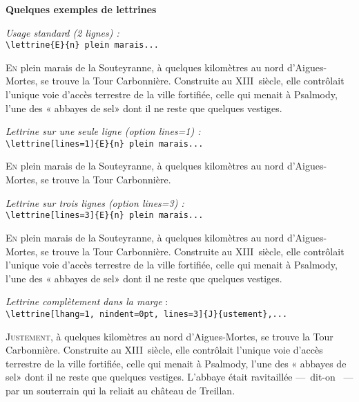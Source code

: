 \documentclass[12pt,a4paper,german,french]{article}
\begin{document}
\thispagestyle{empty}

\begin{center}
\large\bfseries Quelques exemples de lettrines
\end{center}

\vspace{\baselineskip}
\textit{Usage standard (2 lignes) :}\\
\verb+\lettrine{E}{n} plein marais...+

\lettrine{E}{n} plein marais de la Souteyranne, à quelques kilomètres
au nord d'Aigues-Mortes, se trouve la Tour Carbonnière.
Construite au XIII\ieme~siècle, elle contrôlait l'unique voie d'accès
terrestre de la ville fortifiée, celle qui menait à Psalmody,
l'une des « abbayes de sel» dont il ne reste que quelques vestiges.

\vspace{\baselineskip}
\textit{Lettrine sur une seule ligne (option {\ttfamily\upshape lines=1}) :}\\
\verb+\lettrine[lines=1]{E}{n} plein marais...+

\lettrine[lines=1]{E}{n} plein marais de la Souteyranne,
à quelques kilomètres au nord d'Aigues-Mortes, se trouve
la Tour Carbonnière.

\vspace{\baselineskip}
\textit{Lettrine sur trois lignes (option {\ttfamily\upshape lines=3}) :}\\
\verb+\lettrine[lines=3]{E}{n} plein marais...+

\lettrine[lines=3]{E}{n} plein marais de la Souteyranne,
à quelques kilomètres au nord d'Aigues-Mortes,
se trouve la Tour Carbonnière.
Construite au XIII\ieme~siècle, elle contrôlait l'unique voie d'accès
terrestre de la ville fortifiée, celle qui menait à Psalmody,
l'une des « abbayes de sel» dont il ne reste que quelques vestiges.

\vspace{\baselineskip}
\textit{Lettrine complètement dans la marge} :\\
\verb+\lettrine[lhang=1, nindent=0pt, lines=3]{J}{ustement},...+

\lettrine[lhang=1, nindent=0pt, lines=3]{J}{ustement},
à quelques kilomètres au nord d'Aigues-Mortes,
se trouve la Tour Carbonnière.
Construite au XIII\ieme~siècle, elle contrôlait l'unique voie d'accès
terrestre de la ville fortifiée, celle qui menait à Psalmody,
l'une des « abbayes de sel» dont il ne reste que quelques vestiges.
L'abbaye était ravitaillée ---~dit-on ~--- par un souterrain
qui la reliait au château de Treillan.
\end{document}
